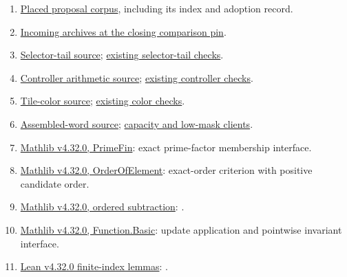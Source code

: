 \documentclass[11pt]{article}
\newcommand{\name}[1]{\texttt{\detokenize{#1}}}
\newcommand{\repo}[2]{\href{https://github.com/VladimirReshetnikov/ProveIt/blob/89226e3921bce3e8949fadd12d3efb6914c7630c/Computability/DiophantineConsistency/Lean/DiophantineConsistency/#1.lean}{#2}}
\begin{document}
\begin{enumerate}
\item \href{https://github.com/VladimirReshetnikov/ProveIt/tree/e429ae09c367c28602613d1d7351a96968aa2f93/Computability/DiophantineConsistency/research/lean-proof-simplification}{Placed proposal corpus},
including its index and adoption record.
\item \href{https://github.com/VladimirReshetnikov/ProveIt/tree/e429ae09c367c28602613d1d7351a96968aa2f93/docs/incoming}{Incoming archives at the closing comparison pin}.
\item \repo{CurrentSelectorTail2011}{Selector-tail source};
\repo{CurrentSelectorTail2011Checks}{existing selector-tail checks}.
\item \repo{CurrentControllerData2011}{Controller arithmetic source};
\repo{CurrentControllerData2011Checks}{existing controller checks}.
\item \repo{CurrentTileColors2011}{Tile-color source};
\repo{CurrentTileColors2011Checks}{existing color checks}.
\item \repo{CurrentWordConstruction2011}{Assembled-word source};
\repo{CurrentWordLowMask2011}{capacity and low-mask clients}.
\item \href{https://github.com/leanprover-community/mathlib4/blob/v4.32.0/Mathlib/Data/Nat/PrimeFin.lean}{Mathlib v4.32.0, PrimeFin}: exact prime-factor membership interface.
\item \href{https://github.com/leanprover-community/mathlib4/blob/v4.32.0/Mathlib/GroupTheory/OrderOfElement.lean}{Mathlib v4.32.0, OrderOfElement}: exact-order criterion with positive candidate order.
\item \href{https://github.com/leanprover-community/mathlib4/blob/v4.32.0/Mathlib/Algebra/Order/Sub/Basic.lean}{Mathlib v4.32.0, ordered subtraction}: \name{tsub_right_inj}.
\item \href{https://github.com/leanprover-community/mathlib4/blob/v4.32.0/Mathlib/Logic/Function/Basic.lean}{Mathlib v4.32.0, Function.Basic}: update application and pointwise invariant interface.
\item \href{https://github.com/leanprover/lean4/blob/v4.32.0/src/Init/Data/Fin/Lemmas.lean}{Lean v4.32.0 finite-index lemmas}: \name{Fin.succ_ne_zero}.
\end{enumerate}
\end{document}
